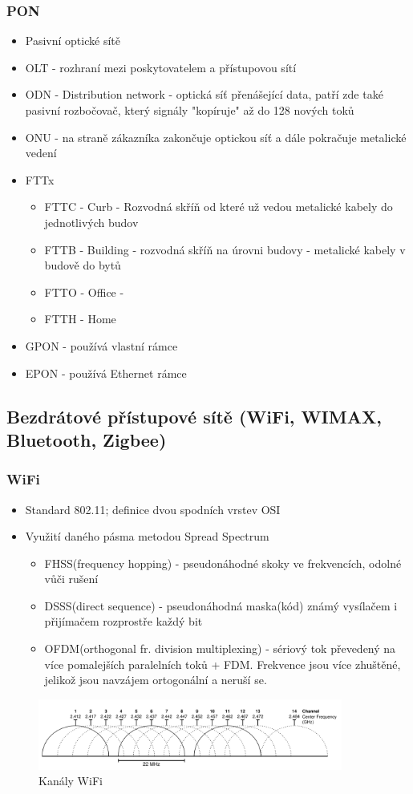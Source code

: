 \documentclass[10pt,a4paper]{article}
\begin{document}
\subsubsection{PON}
\begin{itemize}
\item Pasivní optické sítě
\item OLT - rozhraní mezi poskytovatelem a přístupovou sítí
\item ODN - Distribution network - optická síť přenášející data, patří zde také pasivní rozbočovač, který signály "kopíruje" až do 128 nových toků
\item ONU - na straně zákazníka zakončuje optickou síť a dále pokračuje metalické vedení
\item FTTx
\begin{itemize}
\item FTTC - Curb - Rozvodná skříň od které už vedou metalické kabely do jednotlivých budov
\item FTTB - Building - rozvodná skříň na úrovni budovy - metalické kabely v budově do bytů
\item FTTO - Office -
\item FTTH - Home
\end{itemize}
\item GPON - používá vlastní rámce
\item EPON - používá Ethernet rámce
\end{itemize}

\subsection{Bezdrátové přístupové sítě (WiFi, WIMAX, Bluetooth, Zigbee)}
\subsubsection{WiFi}

\begin{itemize}
\item Standard 802.11; definice dvou spodních vrstev OSI
\item Využití daného pásma metodou Spread Spectrum
\begin{itemize}
\item FHSS(frequency hopping) - pseudonáhodné skoky ve frekvencích, odolné vůči rušení
\item DSSS(direct sequence) - pseudonáhodná maska(kód) známý vysílačem i přijímačem rozprostře každý bit
\item OFDM(orthogonal fr. division multiplexing) - sériový tok převedený na více pomalejších paralelních toků + FDM. Frekvence jsou více zhuštěné, jelikož jsou navzájem ortogonální a neruší se.
\end{itemize}
\end{itemize}
\begin{figure}[ht]
    \centering
    \includegraphics[width=10cm]{wifiChannels.pdf}
    \caption{Kanály WiFi}
    \label{fig:wifiChannels}
\end{figure}
\end{document}
